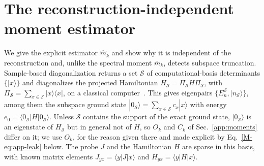 \documentclass[aps,prb,onecolumn,superscriptaddress,longbibliography,floatfix]{revtex4-2}
\begin{document}
\section{The reconstruction-independent moment estimator}
\label{app:estimator}
We give the explicit estimator $\widehat{m}_k$ and show why it is independent of the reconstruction and, unlike the spectral moment $\bar m_k$, detects subspace truncation. Sample-based diagonalization returns a set $\mathcal{S}$ of computational-basis determinants $\{|x\rangle\}$ and diagonalizes the projected Hamiltonian $H_\mathcal{S}=\Pi_\mathcal{S} H\Pi_\mathcal{S}$, with $\Pi_\mathcal{S}=\sum_{x\in\mathcal{S}}|x\rangle\langle x|$, on a classical computer~\cite{SQDchem2025,QSCI2023}. This gives eigenpairs $\{E_n^{\mathcal{S}},|n_{\mathcal{S}}\rangle\}$, among them the subspace ground state $|0_\mathcal{S}\rangle=\sum_{x\in\mathcal{S}}c_x|x\rangle$ with energy ${e_0=\langle 0_\mathcal{S}|H|0_\mathcal{S}\rangle}$. Unless $\mathcal{S}$ contains the support of the exact ground state, $|0_\mathcal{S}\rangle$ is an eigenstate of $H_\mathcal{S}$ but in general not of $H$, so $O_k$ and $C_k$ of Sec.~\ref{app:moments} differ on it; we use $O_k$, for the reason given there and made explicit by Eq.~\eqref{M-eq:app-leak} below. The probe $J$ and the Hamiltonian $H$ are sparse in this basis, with known matrix elements $J_{yx}=\langle y|J|x\rangle$ and $H_{yx}=\langle y|H|x\rangle$.
\end{document}
